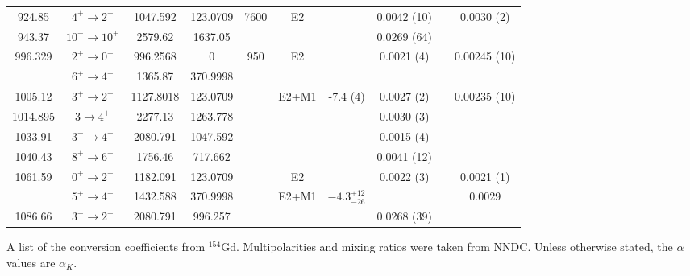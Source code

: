 \begin{landscape}
\begin{longtable}{c|c|c|c|c|c|c|c|c|c}
924.85	&	$4^+	\rightarrow	2^+$	&	1047.592	&	123.0709	&	7600	&	E2	&		&	0.0042	(10)	&		&	0.0030 (2)	\\
943.37	&	$10^-	\rightarrow	10^+$	&	2579.62	&	1637.05	&		&		&		&	0.0269	(64)	&		&		\\
996.329	&	$2^+	\rightarrow	0^+$	&	996.2568	&	0	&	950	&	E2	&		&	0.0021	(4)	&		&	0.00245 (10)	\\
	&	$6^+	\rightarrow	4^+$	&	1365.87	&	370.9998	&		&		&		&					&		&		\\
1005.12	&	$3^+	\rightarrow	2^+$	&	1127.8018	&	123.0709	&		&	E2+M1	&	-7.4 (4)	&	0.0027	(2)	&		&	0.00235 (10)	\\
1014.895	&	$3 	\rightarrow	4^+$	&	2277.13	&	1263.778	&		&		&		&	0.0030	(3)	&		&		\\
1033.91	&	$3^-	\rightarrow	4^+$	&	2080.791	&	1047.592	&		&		&		&	0.0015	(4)	&		&		\\
1040.43	&	$8^+	\rightarrow	6^+$	&	1756.46	&	717.662	&		&		&		&	0.0041	(12)	&		&		\\
1061.59	&	$0^+	\rightarrow	2^+$	&	1182.091	&	123.0709	&		&	E2	&		&	0.0022	(3)	&		&	0.0021 (1)	\\
	&	$5^+	\rightarrow	4^+$	&	1432.588	&	370.9998	&		&	E2+M1	&	$-4.3^{+12}_{-26}$	&					&		&	0.0029	\\
1086.66	&	$3^-	\rightarrow	2^+$	&	2080.791	&	996.257	&		&		&		&	0.0268	(39)	&		&		\\ \bottomrule
    \end{longtable}
    \caption{A list of the conversion coefficients from $^{154}$Gd. Multipolarities and mixing ratios were taken from NNDC. Unless otherwise stated, the $\alpha$ values are $\alpha_K$.}
\end{landscape}

